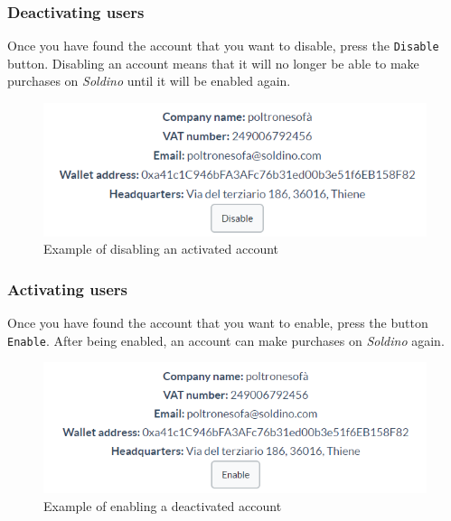 		\subsubsection{Deactivating users}
		Once you have found the account that you want to disable, press the 
		\texttt{Disable} button. Disabling an account means that it will no longer be able to make purchases on \textit{Soldino} 
		until it will be enabled again.

		\begin{figure}[H]
			\includegraphics[width=15cm]{res/images/user_disable.png}
			\centering
			\caption{Example of disabling an activated account}
		\end{figure}
		\subsubsection{Activating users}
		Once you have found the account that you want to enable, press the button 
		\texttt{Enable}. After being enabled, an account can make 
		purchases on \textit{Soldino} again.
		\begin{figure}[H]
			\includegraphics[width=15cm]{res/images/user_enable.png}
			\centering
			\caption{Example of enabling a deactivated account}
		\end{figure}
		
